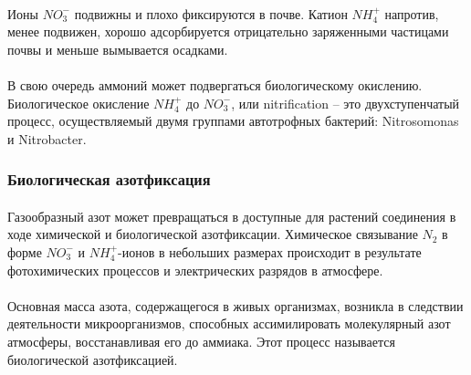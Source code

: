 \paragraph*{}Ионы $NO^{-}_{3}$ подвижны и плохо фиксируются в почве. Катион $NH^{+}_{4}$ напротив, менее подвижен, хорошо адсорбируется отрицательно заряженными частицами почвы и меньше вымывается осадками. 


\paragraph*{}В свою очередь аммоний может подвергаться биологическому окислению. Биологическое окисление $NH^{+}_{4}$ до $NO^{-}_{3}$, или \gls{nitrification} -- это двухступенчатый процесс, осуществляемый двумя группами автотрофных бактерий: Nitrosomonas и Nitrobacter. 

\subsubsection*{Биологическая азотфиксация}

\paragraph*{}Газообразный азот может превращаться в доступные для растений соединения в ходе химической и биологической азотфиксации. Химическое связывание $N_{2}$ в форме $NO^{-}_{3}$ и $NH^{+}_{4}$-ионов в небольших размерах происходит в результате фотохимических процессов и электрических разрядов в атмосфере. 
\paragraph*{}Основная масса азота, содержащегося в живых организмах, возникла в следствии деятельности микроорганизмов, способных ассимилировать молекулярный азот атмосферы, восстанавливая его до аммиака. Этот процесс называется биологической азотфиксацией.

